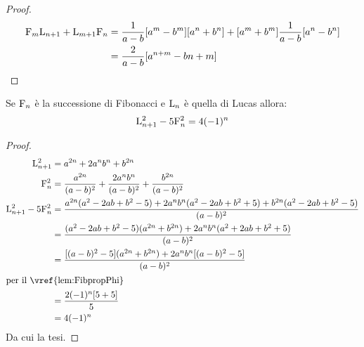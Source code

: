 \begin{proof}
	\begin{align*}
	\mathrm{F}_{m}\mathrm{L}_{n+1}+\mathrm{L}_{m+1}\mathrm{F}_{n}={}&\dfrac{1}{a-b}[a^m-b^m][a^n+b^n]+[a^m+b^m]\dfrac{1}{a-b}[a^n-b^n]\\
	={}&\dfrac{2}{a-b}[a^{n+m}-b{n+m}]
	\end{align*}
\end{proof}
\begin{thm}
	Se $\mathrm{F}_{n}$ è la successione di Fibonacci e  $\mathrm{L}_{n}$ è quella di Lucas allora:
	\begin{equation}
		\mathrm{L}_{n+1}^2-5\mathrm{F}_{n}^2=4(-1)^{n}
	\end{equation}\label{eqn:FibLucFondamentale}
\end{thm}\cite{Rabinowitz_1996}
\begin{proof}
\begin{align*}
	\Luc{n+1}^2={}&a^{2n}+2a^nb^n+b^{2n}\\
	\Fib{n}^2={}&\dfrac{a^{2n}}{(a-b)^2}+\dfrac{2a^{n}b^{n}}{(a-b)^2}+\dfrac{b^{2n}}{(a-b)^2}\\
	\Luc{n+1}^2-5\Fib{n}^2={}&\dfrac{a^{2n}(a^2-2ab+b^2-5)+2a^nb^n(a^2-2ab+b^2+5)+b^{2n}(a^2-2ab+b^2-5)}{(a-b)^2}\\
	={}&\dfrac{(a^2-2ab+b^2-5)(a^{2n}+b^{2n})+2a^nb^n(a^2+2ab+b^2+5)}{(a-b)^2}\\
	={}&\dfrac{[(a-b)^2-5](a^{2n}+b^{2n})+2a^nb^n[(a-b)^2-5]}{(a-b)^2}\\
	\intertext{per il~\vref{lem:FibpropPhi}}
	={}&\dfrac{2(-1)^n[5+5]}{5}\\
	={}&4(-1)^n\\
\end{align*}
Da cui la tesi.
\end{proof}